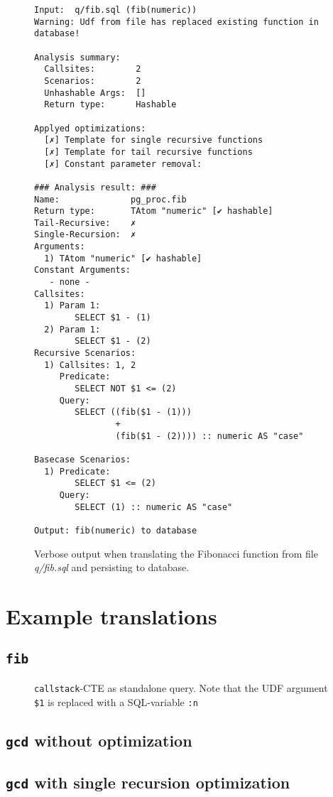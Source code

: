 \begin{figure}[h]
    \centering
    \footnotesize
    \begin{lstlisting}
Input:	q/fib.sql (fib(numeric))
Warning: Udf from file has replaced existing function in database!

Analysis summary:
  Callsites:		2
  Scenarios:		2
  Unhashable Args:	[]
  Return type:		Hashable

Applyed optimizations:
  [✗] Template for single recursive functions
  [✗] Template for tail recursive functions
  [✗] Constant parameter removal: 

### Analysis result: ###
Name:              pg_proc.fib
Return type:       TAtom "numeric" [✔ hashable]
Tail-Recursive:    ✗
Single-Recursion:  ✗
Arguments:
  1) TAtom "numeric" [✔ hashable]
Constant Arguments:
   - none -
Callsites:
  1) Param 1:
        SELECT $1 - (1) 
  2) Param 1:
        SELECT $1 - (2) 
Recursive Scenarios:
  1) Callsites: 1, 2
     Predicate:
        SELECT NOT $1 <= (2) 
     Query:
        SELECT ((fib($1 - (1)))
                +
                (fib($1 - (2)))) :: numeric AS "case" 

Basecase Scenarios:
  1) Predicate:
        SELECT $1 <= (2) 
     Query:
        SELECT (1) :: numeric AS "case" 
        
Output:	fib(numeric) to database
    \end{lstlisting}
    \caption{Verbose output when translating the Fibonacci function from file \textit{q/fib.sql} and persisting to database.}
\end{figure}

\section{Example translations}
\subsection{\texttt{fib}}
\begin{figure}
    \centering
    \caption{\texttt{callstack}-CTE as standalone query. Note that the UDF argument \texttt{\$1} is replaced with a SQL-variable \texttt{:n}}
    \label{fib:callstack_cte_complete}
\end{figure}
\subsection{\texttt{gcd} without optimization}
\subsection{\texttt{gcd} with single recursion optimization}
